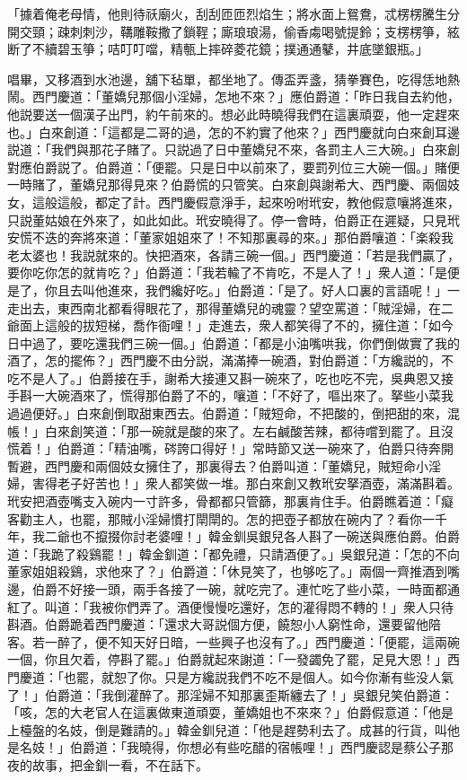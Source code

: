 \begin{myquote}
「據着俺老母情，他則待祅廟火，刮刮匝匝烈焰生；將水面上鴛鴦，忒楞楞騰生分開交頸；疎刺刺沙，鞲雕鞍撒了鎖鞓；廝琅琅湯，偷香䖏喝號提鈴；支楞楞箏，絃断了不續碧玉箏；咭叮叮噹，精甎上摔碎菱花鏡；撲通通鼕，井底墜銀瓶。」
\end{myquote}

唱畢，又移酒到水池邊，舖下毡單，都坐地了。傳盃弄盞，猜拳賽色，吃得恁地熱鬧。西門慶道：「董嬌兒那個小淫婦，怎地不來？」應伯爵道：「昨日我自去約他，他説要送一個漢子出門，約午前來的。想必此時曉得我們在這裏頑耍，他一定趕來也。」白來創道：「這都是二哥的過，怎的不約實了他來？」西門慶就向白來創耳邊説道：「我們與那花子賭了。只説過了日中董嬌兒不來，各罰主人三大碗。」白來創對應伯爵説了。伯爵道：「便罷。只是日中以前來了，要罰列位三大碗一個。」賭便一時賭了，董嬌兒那得見來？伯爵慌的只管笑。白來創與謝希大、西門慶、兩個妓女，這般這般，都定了計。西門慶假意淨手，起來吩咐玳安，教他假意嚷將進來，只説董姑娘在外來了，如此如此。玳安曉得了。停一會時，伯爵正在遲疑，只見玳安慌不迭的奔將來道：「董家姐姐來了！不知那裏尋的來。」那伯爵嚷道：「楽殺我老太婆也！我説就來的。快把酒來，各請三碗一個。」西門慶道：「若是我們贏了，要你吃你怎的就肯吃？」伯爵道：「我若輸了不肯吃，不是人了！」衆人道：「是便是了，你且去叫他進來，我們纔好吃。」伯爵道：「是了。好人口裏的言語呢！」一走出去，東西南北都看得眼花了，那得董嬌兒的魂靈？望空罵道：「賊淫婦，在二爺面上這般的拔短梯，喬作衙哩！」走進去，衆人都笑得了不的，擁住道：「如今日中過了，要吃還我們三碗一個。」伯爵道：「都是小油嘴哄我，你們倒做實了我的酒了，怎的擺佈？」西門慶不由分説，滿滿捧一碗酒，對伯爵道：「方纔説的，不吃不是人了。」伯爵接在手，謝希大接連又斟一碗來了，吃也吃不完，吳典恩又接手斟一大碗酒來了，慌得那伯爵了不的，嚷道：「不好了，嘔出來了。拏些小菜我過過便好。」白來創倒取甜東西去。伯爵道：「賊短命，不把酸的，倒把甜的來，混帳！」白來創笑道：「那一碗就是酸的來了。左右鹹酸苦辣，都待嚐到罷了。且沒慌着！」伯爵道：「精油嘴，硶誇口得好！」常時節又送一碗來了，伯爵只待奔開暫避，西門慶和兩個妓女擁住了，那裏得去？伯爵叫道：「董嬌兒，賊短命小淫婦，害得老子好苦也！」衆人都笑做一堆。那白來創又教玳安拏酒壺，滿滿斟着。玳安把酒壺嘴支入碗内一寸許多，骨都都只管篩，那裏肯住手。伯爵瞧着道：「癡客勸主人，也罷，那賊小淫婦慣打閛閛的。怎的把壺子都放在碗内了？看你一千年，我二爺也不攛掇你討老婆哩！」韓金釧吳銀兒各人斟了一碗送與應伯爵。伯爵道：「我跪了殺鷄罷！」韓金釧道：「都免禮，只請酒便了。」吳銀兒道：「怎的不向董家姐姐殺鷄，求他來了？」伯爵道：「休見笑了，也够吃了。」兩個一齊推酒到嘴邊，伯爵不好接一頭，兩手各接了一碗，就吃完了。連忙吃了些小菜，一時面都通紅了。叫道：「我被你們弄了。酒便慢慢吃還好，怎的灌得悶不轉的！」衆人只待斟酒。伯爵跪着西門慶道：「還求大哥説個方便，饒恕小人窮性命，還要留他陪客。若一醉了，便不知天好日暗，一些興子也沒有了。」西門慶道：「便罷，這兩碗一個，你且欠着，停斟了罷。」伯爵就起來謝道：「一發蠲免了罷，足見大恩！」西門慶道：「也罷，就恕了你。只是方纔説我們不吃不是個人。如今你漸有些没人氣了！」伯爵道：「我倒灌醉了。那淫婦不知那裏歪斯纏去了！」吳銀兒笑伯爵道：「咳，怎的大老官人在這裏做東道頑耍，董嬌姐也不來來？」伯爵假意道：「他是上檯盤的名妓，倒是難請的。」韓金釧兒道：「他是趕勢利去了。成甚的行貨，叫他是名妓！」伯爵道：「我曉得，你想必有些吃醋的宿帳哩！」西門慶認是蔡公子那夜的故事，把金釧一看，不在話下。

